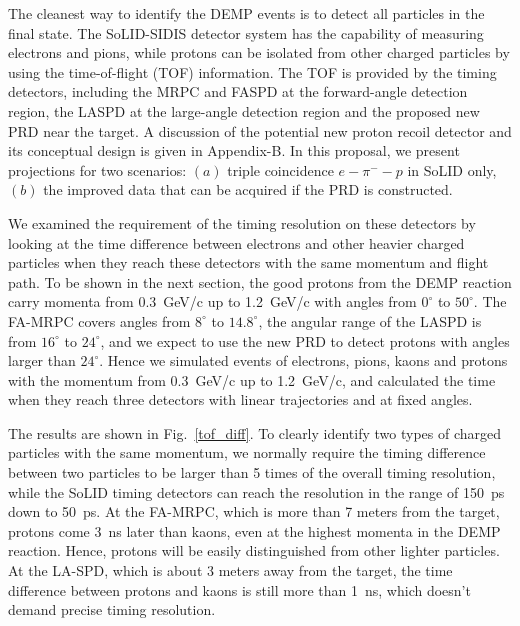 The cleanest way to identify the DEMP events is to detect all particles in the
final state. The SoLID-SIDIS detector system has the capability of measuring
electrons and pions, while protons can be isolated from other charged particles
by using the time-of-flight (TOF) information. The TOF is provided by the timing
detectors, including the MRPC and FASPD at the forward-angle detection region,
the LASPD at the large-angle detection region and the proposed new PRD near the
target. A discussion of the potential new proton recoil detector and its
conceptual design is given in Appendix-B.  In this proposal, we present
projections for two scenarios: $(a)$ triple coincidence $e-\pi^--p$ in SoLID
only, $(b)$ the improved data that can be acquired if the PRD is constructed.

We examined the requirement of the timing resolution on these detectors by
looking at the time difference between electrons and other heavier charged
particles when they reach these detectors with the same momentum and flight
path. To be shown in the next section, the good protons from the DEMP reaction
carry momenta from 0.3~GeV/c up to 1.2~GeV/c with angles from
$0^{\circ}$ to $50^{\circ}$. The FA-MRPC covers angles from
$8^{\circ}$ to $14.8^{\circ}$, the angular range of the LASPD is from
$16^{\circ}$ to $24^{\circ}$, and we expect to use the new PRD to detect
protons with angles larger than $24^{\circ}$.  Hence we simulated
events of electrons, pions, kaons and protons with the momentum from
0.3~GeV/c up to 1.2~GeV/c, and calculated the time when they reach three
detectors with linear trajectories and at fixed angles.

The results are shown in Fig.~\ref{tof_diff}. To clearly identify two types of
charged particles with the same momentum, we normally require the timing
difference between two particles to be larger than 5 times of the overall
timing resolution, while the SoLID timing detectors can reach the resolution
in the range of 150~ps down to 50~ps.  At the FA-MRPC, which is more than 7
meters from the target, protons come 3~ns later than kaons, even at the
highest momenta in the DEMP reaction. Hence, protons will be easily distinguished
from other lighter particles.  At the LA-SPD, which is about 3 meters away from
the target, the time difference between protons and kaons is still more than
1~ns, which doesn't demand precise timing resolution.

